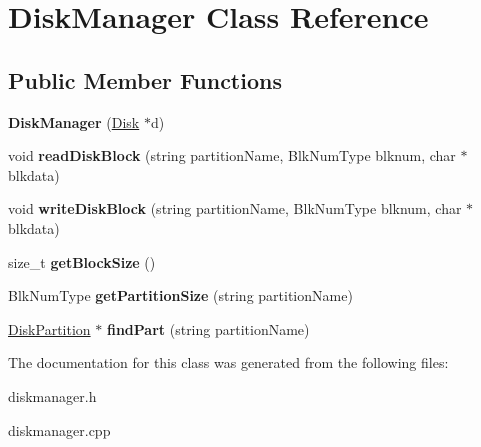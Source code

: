 \hypertarget{classDiskManager}{}\section{Disk\+Manager Class Reference}
\label{classDiskManager}
\subsection*{Public Member Functions}
\begin{DoxyCompactItemize}
\item 
\mbox{\label{classDiskManager_a948cecec230d9895bafaced5534fd6cf}} 
{\bfseries Disk\+Manager} (\mbox{\hyperlink{classDisk}{Disk}} $\ast$d)
\item 
\mbox{\label{classDiskManager_afda24be04fb85711236a4d5905a5ad1c}} 
void {\bfseries read\+Disk\+Block} (string partition\+Name, Blk\+Num\+Type blknum, char $\ast$blkdata)
\item 
\mbox{\label{classDiskManager_ac96846d309a59e8ac7b100724329cb30}} 
void {\bfseries write\+Disk\+Block} (string partition\+Name, Blk\+Num\+Type blknum, char $\ast$blkdata)
\item 
\mbox{\label{classDiskManager_aabdfbb2171f3c19a3ae14f9532876404}} 
size\+\_\+t {\bfseries get\+Block\+Size} ()
\item 
\mbox{\label{classDiskManager_ae32627ccfa72013e35da637570e1729b}} 
Blk\+Num\+Type {\bfseries get\+Partition\+Size} (string partition\+Name)
\item 
\mbox{\label{classDiskManager_a08375c254bc09c8351a4f96cb669f1ab}} 
\mbox{\hyperlink{structDiskPartition}{Disk\+Partition}} $\ast$ {\bfseries find\+Part} (string partition\+Name)
\end{DoxyCompactItemize}


The documentation for this class was generated from the following files\+:\begin{DoxyCompactItemize}
\item 
diskmanager.\+h\item 
diskmanager.\+cpp\end{DoxyCompactItemize}
